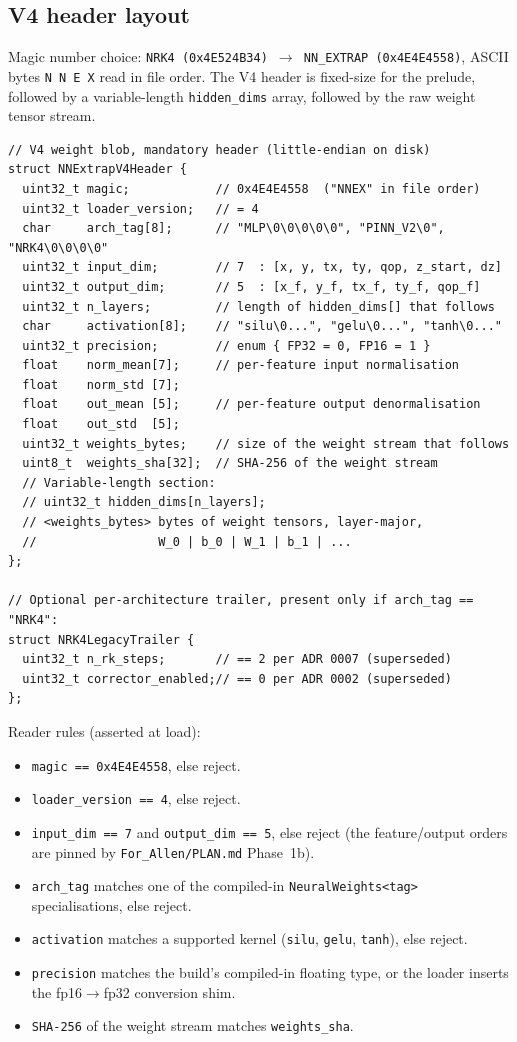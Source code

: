 \documentclass[11pt,a4paper]{article}
\newcommand{\code}[1]{\texttt{#1}}
\begin{document}
\subsection{V4 header layout}

Magic number choice: \code{NRK4 (0x4E524B34) $\to$ NN\_EXTRAP
(0x4E4E4558)}, ASCII bytes \code{N N E X} read in file order. The V4
header is fixed-size for the prelude, followed by a variable-length
\code{hidden\_dims} array, followed by the raw weight tensor stream.

\begin{verbatim}
// V4 weight blob, mandatory header (little-endian on disk)
struct NNExtrapV4Header {
  uint32_t magic;            // 0x4E4E4558  ("NNEX" in file order)
  uint32_t loader_version;   // = 4
  char     arch_tag[8];      // "MLP\0\0\0\0\0", "PINN_V2\0", "NRK4\0\0\0\0"
  uint32_t input_dim;        // 7  : [x, y, tx, ty, qop, z_start, dz]
  uint32_t output_dim;       // 5  : [x_f, y_f, tx_f, ty_f, qop_f]
  uint32_t n_layers;         // length of hidden_dims[] that follows
  char     activation[8];    // "silu\0...", "gelu\0...", "tanh\0..."
  uint32_t precision;        // enum { FP32 = 0, FP16 = 1 }
  float    norm_mean[7];     // per-feature input normalisation
  float    norm_std [7];
  float    out_mean [5];     // per-feature output denormalisation
  float    out_std  [5];
  uint32_t weights_bytes;    // size of the weight stream that follows
  uint8_t  weights_sha[32];  // SHA-256 of the weight stream
  // Variable-length section:
  // uint32_t hidden_dims[n_layers];
  // <weights_bytes> bytes of weight tensors, layer-major,
  //                 W_0 | b_0 | W_1 | b_1 | ...
};

// Optional per-architecture trailer, present only if arch_tag == "NRK4":
struct NRK4LegacyTrailer {
  uint32_t n_rk_steps;       // == 2 per ADR 0007 (superseded)
  uint32_t corrector_enabled;// == 0 per ADR 0002 (superseded)
};
\end{verbatim}

Reader rules (asserted at load):
\begin{itemize}[leftmargin=2em,nosep]
\item \code{magic == 0x4E4E4558}, else reject.
\item \code{loader\_version == 4}, else reject.
\item \code{input\_dim == 7} and \code{output\_dim == 5}, else reject (the
  feature/output orders are pinned by \code{For\_Allen/PLAN.md} Phase~1b).
\item \code{arch\_tag} matches one of the compiled-in
  \code{NeuralWeights<tag>} specialisations, else reject.
\item \code{activation} matches a supported kernel
  (\code{silu}, \code{gelu}, \code{tanh}), else reject.
\item \code{precision} matches the build's compiled-in floating type, or
  the loader inserts the fp16$\to$fp32 conversion shim.
\item \code{SHA-256} of the weight stream matches \code{weights\_sha}.
\end{itemize}
\end{document}
